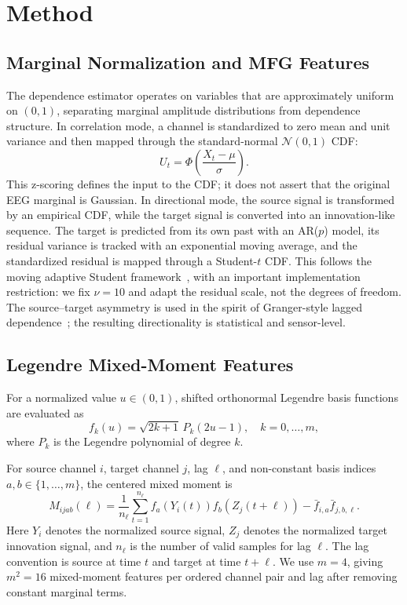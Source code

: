 \documentclass[10pt,journal]{IEEEtran}
\begin{document}
\section{Method}
\subsection{Marginal Normalization and MFG Features}
The dependence estimator operates on variables that are approximately uniform on $(0,1)$, separating marginal amplitude distributions from dependence structure. In correlation mode, a channel is standardized to zero mean and unit variance and then mapped through the standard-normal $\mathcal{N}(0,1)$ CDF:
\begin{equation}
    U_t = \Phi\left(\frac{X_t-\mu}{\sigma}\right).
\end{equation}
This z-scoring defines the input to the CDF; it does not assert that the original EEG marginal is Gaussian. In directional mode, the source signal is transformed by an empirical CDF, while the target signal is converted into an innovation-like sequence. The target is predicted from its own past with an AR($p$) model, its residual variance is tracked with an exponential moving average, and the standardized residual is mapped through a Student-$t$ CDF. This follows the moving adaptive Student framework~\cite{duda2023adaptive}, with an important implementation restriction: we fix $\nu=10$ and adapt the residual scale, not the degrees of freedom. The source--target asymmetry is used in the spirit of Granger-style lagged dependence~\cite{granger1980testing}; the resulting directionality is statistical and sensor-level.

\subsection{Legendre Mixed-Moment Features}
For a normalized value $u\in(0,1)$, shifted orthonormal Legendre basis functions are evaluated as
\begin{equation}
    f_k(u)=\sqrt{2k+1}\,P_k(2u-1),\quad k=0,\dots,m,
\end{equation}
where $P_k$ is the Legendre polynomial of degree $k$.

For source channel $i$, target channel $j$, lag $\ell$, and non-constant basis indices $a,b\in\{1,\dots,m\}$, the centered mixed moment is
\begin{equation}
    M_{ijab}(\ell)
    =
    \frac{1}{n_\ell}\sum_{t=1}^{n_\ell}f_a(Y_i(t))f_b(Z_j(t+\ell))
    -
    \bar{f}_{i,a}\bar{f}_{j,b,\ell}.
    \label{eq:mixed_moment}
\end{equation}
Here $Y_i$ denotes the normalized source signal, $Z_j$ denotes the normalized target innovation signal, and $n_\ell$ is the number of valid samples for lag $\ell$. The lag convention is source at time $t$ and target at time $t+\ell$. We use $m=4$, giving $m^2=16$ mixed-moment features per ordered channel pair and lag after removing constant marginal terms.
\end{document}
